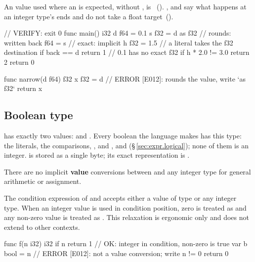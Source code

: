 \begin{constraint}
  An  value used where an  is expected, without , is
  \illformed{}~().  ,  and  say what happens at an
  integer type's ends and do not take a float target~().
\end{constraint}

\begin{laincode}
// VERIFY: exit 0
func main() i32 {
    d f64 = 0.1
    s f32 = d as f32          // rounds: written
    back f64 = s              // exact: implicit
    h f32 = 1.5               // a literal takes the f32 destination
    if back == d { return 1 } // 0.1 has no exact f32
    if h * 2.0 != 3.0 { return 2 }
    return 0
}
\end{laincode}

\begin{laincode}
func narrow(d f64) f32 {
    x f32 = d                 // ERROR [E012]: rounds the value, write `as f32`
    return x
}
\end{laincode}

\subsection{Boolean type}
\label{sec:types.bool}

\pnum
{} has exactly two values:  and .  Every boolean the language
makes has this type: the literals, the comparisons, , and ,  and
\lain{!} (\S\,\ref{sec:expr.logical}); none of them is an integer.
 is stored as a single byte; its exact representation is
.

\begin{constraint}
  There are no implicit \textbf{value} conversions between 
  and any integer type for general arithmetic or assignment.
\end{constraint}

\pnum
The condition expression of  and  accepts either
a value of type  or any integer type.  When an integer
value is used in condition position, zero is treated as 
and any non-zero value is treated as .  This relaxation is
ergonomic only and does not extend to other contexts.

\begin{example}
\begin{laincode}
func f(n i32) i32 {
    if n { return 1 }       // OK: integer in condition, non-zero is true
    var b bool = n          // ERROR [E012]: not a value conversion; write n != 0
    return 0
}
\end{laincode}
\end{example}

